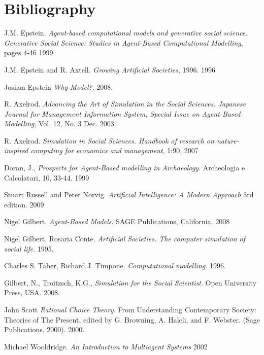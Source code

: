 \documentclass[11pt,oneside,a4paper,openright]{report}
\begin{document}
\chapter{Bibliography}
\begin{thebibliography}{13}

	J.M. Epstein. 
	\emph{Agent-based computational models and generative social science. Generative Social
	Science: Studies in Agent-Based Computational Modelling}, pages 4-46
	1999

	J.M. Epstein and R. Axtell.
	\emph{Growing Artificial Societies}, 1996.
	1996

	Joshua Epstein
	\emph{Why Model?}.
	2008.

	R. Axelrod. 
	\emph{Advancing the Art of Simulation in the Social Sciences. Japanese Journal for Management Information System, Special Issue on Agent-Based Modelling}, Vol. 12, No. 3 
	Dec. 2003. 

	R. Axelrod. 
	\emph{Simulation in Social Sciences. Handbook of research on nature-inspired computing for economics and management}, 1:90, 
	2007

	Doran, J., 
	\emph{Prospects for Agent-Based modelling in Archaeology}. Archeologia e Calcolatori, 10, 33-44.
	1999

	Stuart Russell and Peter Norvig.
	\emph{Artificial Intelligence: A Modern Approach} 3rd edition.
	2009

	Nigel Gilbert.
	\emph{Agent-Based Models}. SAGE Publications, California.
	2008

	Nigel Gilbert, Rosaria Conte.
	\emph{Artificial Societies. The computer simulation of social life}.
	1995.

	Charles S. Taber, Richard J. Timpone.
	\emph{Computational modelling}.
	1996.

	Gilbert, N., Troitzsch, K.G.,
	\emph{Simulation for the Social Scientist}. Open University Press, USA.
	2008.

	John Scott
	\emph{Rational Choice Theory}. From Understanding Contemporary Society: Theories of The Present, edited by G. Browning,
	A. Halcli, and F. Webster. (Sage Publications, 2000).
	2000.

	Michael Wooldridge.
	\emph{An Introduction to Multiagent Systems}
	2002


\end{thebibliography}
\end{document}
